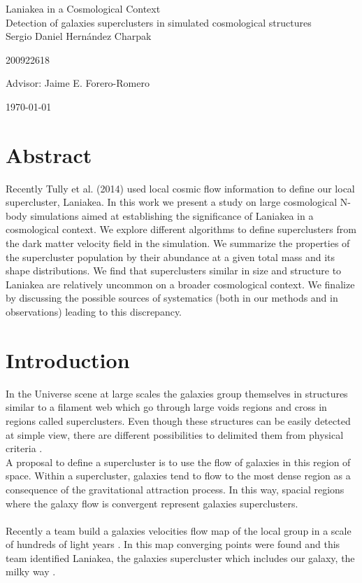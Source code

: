 \documentclass[12pt]{article}
\begin{document}
\begin{center}
\Huge
Laniakea in a Cosmological Context\\
Detection of galaxies superclusters in simulated cosmological structures\\  
\vspace{3mm}
\Large Sergio Daniel Hern\'{a}ndez Charpak

\large
200922618

\vspace{2mm}
\Large
Advisor: Jaime E. Forero-Romero

\normalsize
\vspace{2mm}

\today
\end{center}


\normalsize
\tableofcontents
\newpage

\section{Abstract}
Recently Tully et al. (2014) \cite{tully_laniakea_2014} used local cosmic flow
 information to define our local supercluster, Laniakea. 
In this work we present a study on large cosmological N-body
simulations aimed at establishing the significance of Laniakea in a
cosmological context.
We explore different algorithms to define superclusters from the dark
matter velocity field in the simulation. 
We summarize the properties of the supercluster population by their
abundance at a given total mass and its shape distributions.
We find that superclusters similar in size and structure to Laniakea are
relatively uncommon on a broader cosmological context.
We finalize by discussing the possible sources of systematics (both in
our methods and in observations) leading to this discrepancy.

\section{Introduction}

In the Universe scene at large scales the galaxies group themselves in structures
similar to a filament web which go through large voids regions and cross in regions
called superclusters. Even though these structures can be easily detected at simple
view, there are different possibilities to delimited them from physical criteria \cite{gott_iii_map_2005}.    
\\

A proposal to define a supercluster is to use the flow of galaxies in this region of
space. Within a supercluster, galaxies tend to flow to the most dense region as a
consequence of the gravitational attraction process. In this way, spacial regions where
the galaxy flow is convergent represent galaxies superclusters.\\
\\
Recently a team build a galaxies velocities flow map of the local group in a scale of
hundreds of light years \cite{tully_cosmicflows-2_2013}. In this map converging points
were found and this team identified Laniakea, the galaxies supercluster which includes
our galaxy, the milky way \cite{tully_laniakea_2014}.
\\   
\end{document}
